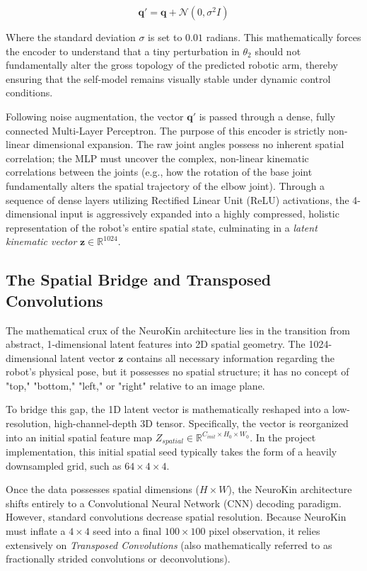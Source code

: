 \documentclass[12pt,a4paper,oneside]{report}
\begin{document}
\begin{equation}
\mathbf{q}' = \mathbf{q} + \mathcal{N}(0, \sigma^2 I)
\end{equation}

Where the standard deviation $\sigma$ is set to $0.01$ radians. This mathematically forces the encoder to understand that a tiny perturbation in $\theta_2$ should not fundamentally alter the gross topology of the predicted robotic arm, thereby ensuring that the self-model remains visually stable under dynamic control conditions.

Following noise augmentation, the vector $\mathbf{q}'$ is passed through a dense, fully connected Multi-Layer Perceptron. The purpose of this encoder is strictly non-linear dimensional expansion. The raw joint angles possess no inherent spatial correlation; the MLP must uncover the complex, non-linear kinematic correlations between the joints (e.g., how the rotation of the base joint fundamentally alters the spatial trajectory of the elbow joint). Through a sequence of dense layers utilizing Rectified Linear Unit (ReLU) activations, the 4-dimensional input is aggressively expanded into a highly compressed, holistic representation of the robot's entire spatial state, culminating in a \textit{latent kinematic vector} $\mathbf{z} \in \mathbb{R}^{1024}$.

\subsection{The Spatial Bridge and Transposed Convolutions}

The mathematical crux of the NeuroKin architecture lies in the transition from abstract, 1-dimensional latent features into 2D spatial geometry. The 1024-dimensional latent vector $\mathbf{z}$ contains all necessary information regarding the robot's physical pose, but it possesses no spatial structure; it has no concept of "top," "bottom," "left," or "right" relative to an image plane.

To bridge this gap, the 1D latent vector is mathematically reshaped into a low-resolution, high-channel-depth 3D tensor. Specifically, the vector is reorganized into an initial spatial feature map $Z_{spatial} \in \mathbb{R}^{C_{init} \times H_0 \times W_0}$. In the project implementation, this initial spatial seed typically takes the form of a heavily downsampled grid, such as $64 \times 4 \times 4$. 

Once the data possesses spatial dimensions ($H \times W$), the NeuroKin architecture shifts entirely to a Convolutional Neural Network (CNN) decoding paradigm. However, standard convolutions decrease spatial resolution. Because NeuroKin must inflate a $4 \times 4$ seed into a final $100 \times 100$ pixel observation, it relies extensively on \textit{Transposed Convolutions} (also mathematically referred to as fractionally strided convolutions or deconvolutions).
\end{document}
